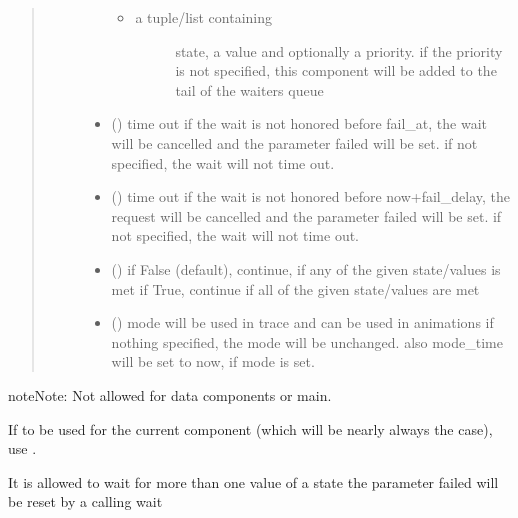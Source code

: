 \documentclass[letterpaper,10pt,english]{sphinxmanual}
\begin{document}
\begin{fulllineitems}
\begin{fulllineitems}
\begin{quote}
\begin{description}
\begin{itemize}
\begin{itemize}
\item {} \begin{description}
\item[{a tuple/list containing }] \leavevmode
state, a value and optionally a priority. 
if the priority is not specified, this component will
be added to the tail of
the waiters queue 

\end{description}

\end{itemize}


\item {} 
 () \textendash{} time out 
if the wait is not honored before fail\_at,
the wait will be cancelled and the
parameter failed will be set. 
if not specified, the wait will not time out.

\item {} 
 () \textendash{} time out 
if the wait is not honored before now+fail\_delay,
the request will be cancelled and the
parameter failed will be set. 
if not specified, the wait will not time out.

\item {} 
 () \textendash{} if False (default), continue, if any of the given state/values is met 
if True, continue if all of the given state/values are met

\item {} 
 () \textendash{} mode 
will be used in trace and can be used in animations 
if nothing specified, the mode will be unchanged. 
also mode\_time will be set to now, if mode is set.

\end{itemize}

\end{description}\end{quote}

\begin{sphinxadmonition}{note}{Note:}
Not allowed for data components or main.

If to be used for the current component
(which will be nearly always the case),
use .

It is allowed to wait for more than one value of a state 
the parameter failed will be reset by a calling wait


\end{sphinxadmonition}
\end{fulllineitems}
\end{fulllineitems}
\end{document}
